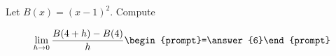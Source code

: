 \documentclass{ximera}
\author{Bart Snapp}
\begin{document}
\begin{exercise}
Let $B(x) = (x-1)^2$. Compute

\[
\lim_{ h\to 0 } \frac{B(4+h)-B(4)}{h} \begin{prompt}=\answer{6}\end{prompt}
\]
\end{exercise}
\end{document}
